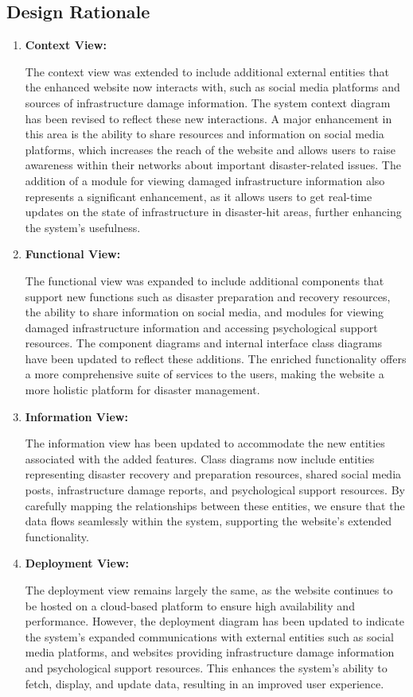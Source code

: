 \documentclass[12pt, letterpaper]{article}
\begin{document}
\newpage

\subsection{Design Rationale}
\begin{enumerate}
    \item \textbf{Context View:}

    The context view was extended to include additional external entities that the enhanced website now interacts with, such as social media platforms and sources of infrastructure damage information. The system context diagram has been revised to reflect these new interactions. A major enhancement in this area is the ability to share resources and information on social media platforms, which increases the reach of the website and allows users to raise awareness within their networks about important disaster-related issues. The addition of a module for viewing damaged infrastructure information also represents a significant enhancement, as it allows users to get real-time updates on the state of infrastructure in disaster-hit areas, further enhancing the system's usefulness.

    \item \textbf{Functional View:}

    The functional view was expanded to include additional components that support new functions such as disaster preparation and recovery resources, the ability to share information on social media, and modules for viewing damaged infrastructure information and accessing psychological support resources. The component diagrams and internal interface class diagrams have been updated to reflect these additions. The enriched functionality offers a more comprehensive suite of services to the users, making the website a more holistic platform for disaster management.

    \item \textbf{Information View:}
    
    The information view has been updated to accommodate the new entities associated with the added features. Class diagrams now include entities representing disaster recovery and preparation resources, shared social media posts, infrastructure damage reports, and psychological support resources. By carefully mapping the relationships between these entities, we ensure that the data flows seamlessly within the system, supporting the website's extended functionality.
    
    \item \textbf{Deployment View:}
    
    The deployment view remains largely the same, as the website continues to be hosted on a cloud-based platform to ensure high availability and performance. However, the deployment diagram has been updated to indicate the system's expanded communications with external entities such as social media platforms, and websites providing infrastructure damage information and psychological support resources. This enhances the system's ability to fetch, display, and update data, resulting in an improved user experience.
\end{enumerate}
\end{document}
